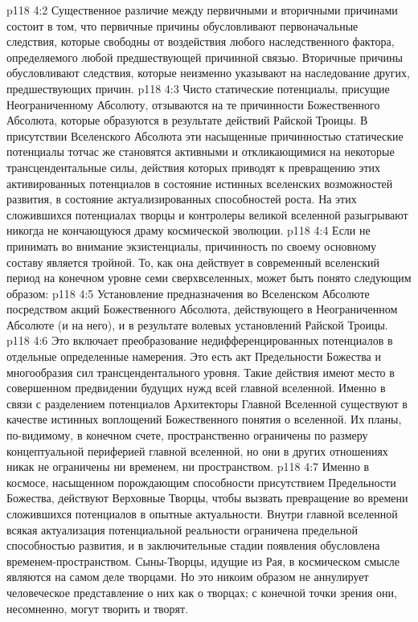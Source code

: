 \vs p118 4:2 Существенное различие между первичными и вторичными причинами состоит в том, что первичные причины обусловливают первоначальные следствия, которые свободны от воздействия любого наследственного фактора, определяемого любой предшествующей причинной связью. Вторичные причины обусловливают следствия, которые неизменно указывают на наследование других, предшествующих причин.
\vs p118 4:3 \pc Чисто статические потенциалы, присущие Неограниченному Абсолюту, отзываются на те причинности Божественного Абсолюта, которые образуются в результате действий Райской Троицы. В присутствии Вселенского Абсолюта эти насыщенные причинностью статические потенциалы тотчас же становятся активными и откликающимися на некоторые трансцендентальные силы, действия которых приводят к превращению этих активированных потенциалов в состояние истинных вселенских возможностей развития, в состояние актуализированных способностей роста. На этих сложившихся потенциалах творцы и контролеры великой вселенной разыгрывают никогда не кончающуюся драму космической эволюции.
\vs p118 4:4 Если не принимать во внимание экзистенциалы, причинность по своему основному составу является тройной. То, как она действует в современный вселенский период на конечном уровне семи сверхвселенных, может быть понято следующим образом:
\vs p118 4:5 \bibnobreakspace {} Установление предназначения во Вселенском Абсолюте посредством акций Божественного Абсолюта, действующего в Неограниченном Абсолюте (и на него), и в результате волевых установлений Райской Троицы.
\vs p118 4:6 \pc {}\bibnobreakspace {} Это включает преобразование недифференцированных потенциалов в отдельные определенные намерения. Это есть акт Предельности Божества и многообразия сил трансцендентального уровня. Такие действия имеют место в совершенном предвидении будущих нужд всей главной вселенной. Именно в связи с разделением потенциалов Архитекторы Главной Вселенной существуют в качестве истинных воплощений Божественного понятия о вселенной. Их планы, по\hyp{}видимому, в конечном счете, пространственно ограничены по размеру концептуальной периферией главной вселенной, но  они в других отношениях никак не ограничены ни временем, ни пространством.
\vs p118 4:7 \pc {}\bibnobreakspace {} Именно в космосе, насыщенном порождающим способности присутствием Предельности Божества, действуют Верховные Творцы, чтобы вызвать превращение во времени сложившихся потенциалов в опытные актуальности. Внутри главной вселенной всякая актуализация потенциальной реальности ограничена предельной способностью развития, и в заключительные стадии появления обусловлена временем\hyp{}пространством. Сыны\hyp{}Творцы, идущие из Рая, в космическом смысле являются на самом деле  творцами. Но это никоим образом не аннулирует человеческое представление о них как о творцах; с конечной точки зрения они, несомненно, могут творить и творят.
